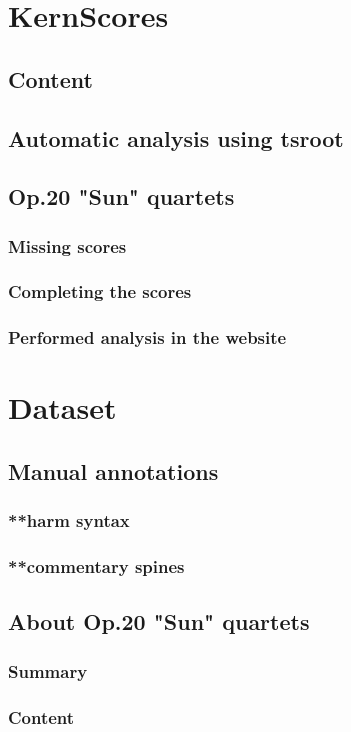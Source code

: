 \section{KernScores}
  \subsection{Content}
  \subsection{Automatic analysis using tsroot}
  \subsection{Op.20 "Sun" quartets}
    \subsubsection{Missing scores}
    \subsubsection{Completing the scores}
    \subsubsection{Performed analysis in the website}
\section{Dataset}
	\subsection{Manual annotations}
		\subsubsection{**harm syntax}
		\subsubsection{**commentary spines}
	\subsection{About Op.20 "Sun" quartets}
		\subsubsection{Summary}
		\subsubsection{Content}
